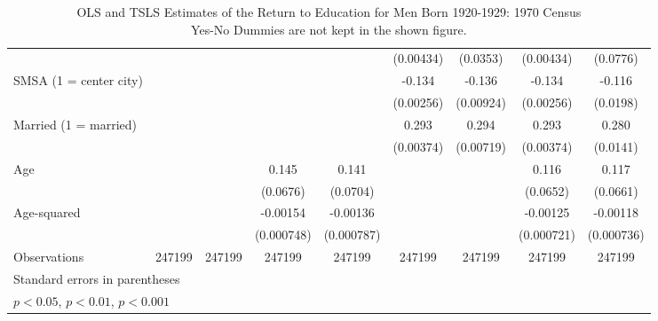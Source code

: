 \documentclass{article}
\begin{document}
\begin{landscape}
\begin{table}[htbp]
\begin{tabular}{l*{8}{c}}
                         &                     &                     &                     &                     &   (0.00434)         &    (0.0353)         &   (0.00434)         &    (0.0776)         \\
[1em]
SMSA (1 = center city)   &                     &                     &                     &                     &      -0.134\sym{***}&      -0.136\sym{***}&      -0.134\sym{***}&      -0.116\sym{***}\\
                         &                     &                     &                     &                     &   (0.00256)         &   (0.00924)         &   (0.00256)         &    (0.0198)         \\
[1em]
Married (1 = married)    &                     &                     &                     &                     &       0.293\sym{***}&       0.294\sym{***}&       0.293\sym{***}&       0.280\sym{***}\\
                         &                     &                     &                     &                     &   (0.00374)         &   (0.00719)         &   (0.00374)         &    (0.0141)         \\
[1em]
Age                      &                     &                     &       0.145\sym{*}  &       0.141\sym{*}  &                     &                     &       0.116         &       0.117         \\
                         &                     &                     &    (0.0676)         &    (0.0704)         &                     &                     &    (0.0652)         &    (0.0661)         \\
[1em]
Age-squared              &                     &                     &    -0.00154\sym{*}  &    -0.00136         &                     &                     &    -0.00125         &    -0.00118         \\
                         &                     &                     &  (0.000748)         &  (0.000787)         &                     &                     &  (0.000721)         &  (0.000736)         \\
\hline
Observations             &      247199         &      247199         &      247199         &      247199         &      247199         &      247199         &      247199         &      247199         \\
\hline\hline
\multicolumn{9}{l}{\footnotesize Standard errors in parentheses}\\
\multicolumn{9}{l}{\footnotesize \sym{*} \(p<0.05\), \sym{**} \(p<0.01\), \sym{***} \(p<0.001\)}\\
\end{tabular}
\caption[caption]{OLS and TSLS Estimates of the Return to Education for Men Born 1920-1929: 1970 Census \\\hspace{\textwidth}  Yes-No Dummies are not kept in the shown figure.}
\end{table}
\end{landscape}
\end{document}

